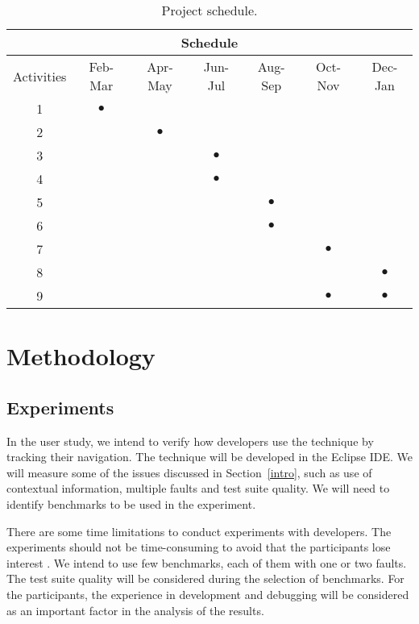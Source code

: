 \documentclass[12pt,a4paper,espaco=umemeio,noindentfirst,oneside,openany,tocpage=plain,pnumromarab,ruledheader,time,anapcustomindent]{sty/abnt}
\begin{document}
\begin{table}
\caption{Project schedule.}
\label{tab-timeline}
\centering
\begin{tabular}{|c||c|c|c|c|c|c|}
\hline
\multicolumn{7}{|c|}{Schedule} \\
\hline
\cline{2-7} Activities & Feb-Mar & Apr-May & Jun-Jul & Aug-Sep & Oct-Nov & Dec-Jan \\
\hline 1 & $\bullet$ &  &  &  &  &  \\
\hline 2 &  & $\bullet$ &  &  &  &  \\
\hline 3 &  &  & $\bullet$ &  &  &  \\
\hline 4 &  &  & $\bullet$ &  &  &  \\
\hline 5 &  &  &  & $\bullet$ &  &  \\
\hline 6 &  &  &  & $\bullet$ &  &  \\
\hline 7 &  &  &  &  & $\bullet$ &  \\
\hline 8 &  &  &  &  &  & $\bullet$ \\
\hline 9 &  &  &  &  & $\bullet$ & $\bullet$ \\
\hline
\end{tabular}
\end{table}

\section{Methodology}
\label{methodology}

\subsection{Experiments}
\label{experiments}

In the user study, we intend to verify how developers use the technique by tracking their navigation. The technique will 
be developed in the Eclipse IDE. We will measure some of the issues discussed in Section~\ref{intro}, such as use of 
contextual information, multiple faults and test suite quality. We will need to identify benchmarks to be used in the 
experiment.

There are some time limitations to conduct experiments with developers. The experiments should not be time-consuming 
to avoid that the participants lose interest \cite{wainer2006}. We intend to use few benchmarks, each of them with 
one or two faults. The test suite quality will be considered during the selection of benchmarks. For the participants, 
the experience in development and debugging will be considered as an important factor in the analysis of the results.
\end{document}
